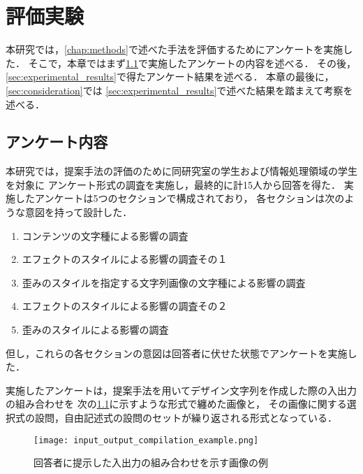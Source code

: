\documentclass[\homedir/main.tex]{subfiles}
\begin{document}
\setcounter{chapter}{4}
\chapter{評価実験}\label{chap:experiment}
本研究では，\cref{chap:methods}で述べた手法を評価するためにアンケートを実施した．
そこで，本章ではまず\cref{sec:experimental_details}で実施したアンケートの内容を述べる．
その後，\cref{sec:experimental_results}で得たアンケート結果を述べる．
本章の最後に，\cref{sec:consideration}では
\cref{sec:experimental_results}で述べた結果を踏まえて考察を述べる．

\section{アンケート内容}\label{sec:experimental_details}
本研究では，提案手法の評価のために同研究室の学生および情報処理領域の学生を対象に
アンケート形式の調査を実施し，最終的に計15人から回答を得た．
実施したアンケートは5つのセクションで構成されており，
各セクションは次のような意図を持って設計した．

\begin{enumerate}[label=\textbf{セクション\arabic*.}]
    \setlength{\leftskip}{3.0cm}
    \item コンテンツの文字種による影響の調査
    \item エフェクトのスタイルによる影響の調査その１
    \item 歪みのスタイルを指定する文字列画像の文字種による影響の調査
    \item エフェクトのスタイルによる影響の調査その２
    \item 歪みのスタイルによる影響の調査
\end{enumerate}

但し，これらの各セクションの意図は回答者に伏せた状態でアンケートを実施した．

実施したアンケートは，提案手法を用いてデザイン文字列を作成した際の入出力の組み合わせを
次の\cref{fig:io_compilation_eg}に示すような形式で纏めた画像と，
その画像に関する選択式の設問，自由記述式の設問のセットが繰り返される形式となっている．

\begin{figure}[h]
    \centering
    \texttt{[image: input\_output\_compilation\_example.png]}
    \caption{回答者に提示した入出力の組み合わせを示す画像の例}
    \label{fig:io_compilation_eg}
\end{figure}
\end{document}
